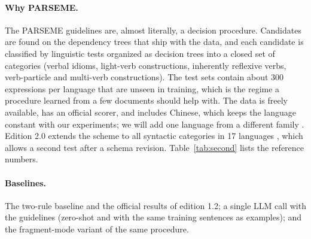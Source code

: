 \paragraph{Why PARSEME.} The PARSEME guidelines are, almost literally, a decision procedure. Candidates are found on the dependency trees that ship with the data, and each candidate is classified by linguistic tests organized as decision trees into a closed set of categories (verbal idioms, light-verb constructions, inherently reflexive verbs, verb-particle and multi-verb constructions). The test sets contain about 300 expressions per language that are unseen in training, which is the regime a procedure learned from a few documents should help with. The data is freely available, has an official scorer, and includes Chinese, which keeps the language constant with our \umr experiments; we will add one language from a different family . Edition 2.0 extends the scheme to all syntactic categories in 17 languages \citep{scholivet2026parseme}, which allows a second test after a schema revision. Table~\ref{tab:second} lists the reference numbers.

\begin{table}[h]
\centering\small
\setlength{\tabcolsep}{4pt}
\caption{Planned second benchmark. Reference numbers are from \citet{ramisch2020parseme}. Global F1 for the reference systems will be taken from the official result tables.}
\label{tab:second}
\end{table}

\paragraph{Baselines.} The two-rule baseline and the official results of edition 1.2; a single LLM call with the guidelines (zero-shot and with the same training sentences as examples); and the fragment-mode variant of the same procedure.

